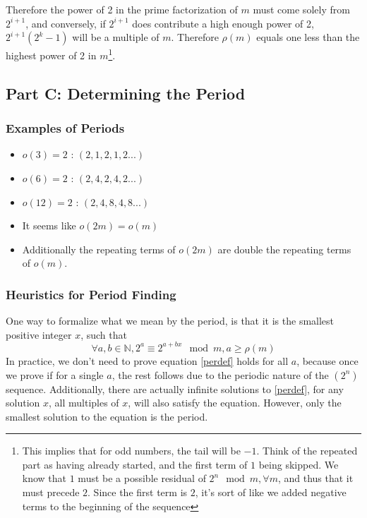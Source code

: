 \documentclass{article}
\begin{document}
  Therefore the power of 2 in the prime factorization of $m$ must come solely from $2^{i+1}$, and conversely, if $2^{i+1}$ does contribute a high enough power of 2, $2^{i+1}(2^k-1)$ will be a multiple of $m$. Therefore $\rho(m)$ equals one less than the highest power of 2 in $m$\footnote{This implies that for odd numbers, the tail will be $-1$. Think of the repeated part as having already started, and the first term of $1$ being skipped. We know that $1$ must be a possible residual of $2^n \mod m, \forall m$, and thus that it must precede $2$. Since the first term is $2$, it's sort of like we added negative terms to the beginning of the sequence}.
  \subsection{Part C: Determining the Period}
  \subsubsection{Examples of Periods}
  \begin{itemize}
  \item $o(3) = 2$ : $(2, 1, 2, 1, 2 ...)$
  \item $o(6) = 2$ : $(2, 4, 2, 4, 2 ...)$
  \item $o(12)= 2$ : $(2, 4, 8, 4, 8 ...)$
  \item It seems like $o(2m) = o(m)$
  \item Additionally the repeating terms of $o(2m)$ are double the repeating terms of $o(m)$.
  \end{itemize}
  \subsubsection{Heuristics for Period Finding}
  One way to formalize what we mean by the period, is that it is the smallest positive integer $x$, such that
  \begin{equation}\label{perdef}
    \forall a, b \in \mathbb{N}, 2^a \equiv 2^{a+bx} \mod m, a \geq \rho(m)
  \end{equation}
  In practice, we don't need to prove equation \eqref{perdef} holds for all $a$, because once we prove if for a single $a$, the rest follows due to the periodic nature of the $(2^n)$ sequence. Additionally, there are actually infinite solutions to \eqref{perdef}, for any solution $x$, all multiples of $x$, will also satisfy the equation. However, only the smallest solution to the equation is the period.\\
  
\end{document}
